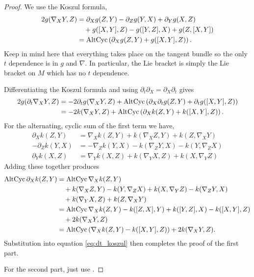 \begin{proof}
We use the Koszul formula,
\[
\begin{split}
2 g(\nabla_X Y, Z) &= \partial_X g(Z, Y) - \partial_Z g(Y, X) + \partial_Y g(X, Z) \\
&\quad + g([X, Y], Z) - g([Y, Z], X) + g(Z, [X, Y]) \\
&= \operatorname{AltCyc} \left(\partial_X g(Z, Y) + g([X, Y], Z)\right).
\end{split}
\]
Keep in mind here that everything takes place on the tangent bundle so the only \(t\) dependence is in \(g\) and \(\nabla\). In particular, the Lie bracket is simply the Lie bracket on \(M\) which has no \(t\) dependence.

Differentiating the Koszul formula and using \(\partial_t \partial_X = \partial_X \partial_t\) gives
\begin{equation}
\label{eq:dt_koszul}
\begin{split}
2 g(\partial_t \nabla_X Y, Z) &= -2 \partial_t g(\nabla_X Y, Z) + \operatorname{AltCyc} \left(\partial_X \partial_t g(Z, Y) + \partial_t g([X, Y], Z)\right) \\
&= -2 k (\nabla_X Y, Z) + \operatorname{AltCyc} \left(\partial_X k (Z, Y) + k ([X, Y], Z)\right).
\end{split}
\end{equation}
For the alternating, cyclic sum of the first term we have,
\begin{align*}
\partial_X k (Z, Y) &= \nabla_X k (Z, Y) + k(\nabla_X Z, Y) + k(Z, \nabla_X Y) \\
-\partial_Z k (Y, X) &= -\nabla_Z k (Y, X) - k(\nabla_Z Y, X) - k(Y, \nabla_Z X) \\
\partial_Y k (X, Z) &= \nabla_Y k (X, Z) + k(\nabla_Y X, Z) + k(X, \nabla_Y Z)
\end{align*}
Adding these together produces
\[
\begin{split}
\operatorname{AltCyc} \partial_X k (Z, Y) &= \operatorname{AltCyc} \nabla_X k (Z, Y) \\
&\quad + k(\nabla_X Z, Y) - k(Y, \nabla_Z X) + k(X, \nabla_Y Z) - k(\nabla_Z Y, X) \\
&\quad + k(\nabla_Y X, Z) + k(Z, \nabla_X Y) \\
&= \operatorname{AltCyc} \nabla_X k (Z, Y) - k([Z, X], Y) + k([Y, Z], X) - k([X, Y], Z) \\
&\quad + 2 k(\nabla_X Y, Z) \\
&= \operatorname{AltCyc} \left(\nabla_X k (Z, Y) - k ([X, Y], Z)\right) + 2 k (\nabla_X Y, Z) .
\end{split}
\]
Substitution into equation \eqref{eq:dt_koszul} then completes the proof of the first part.

For the second part, just use .
\end{proof}

